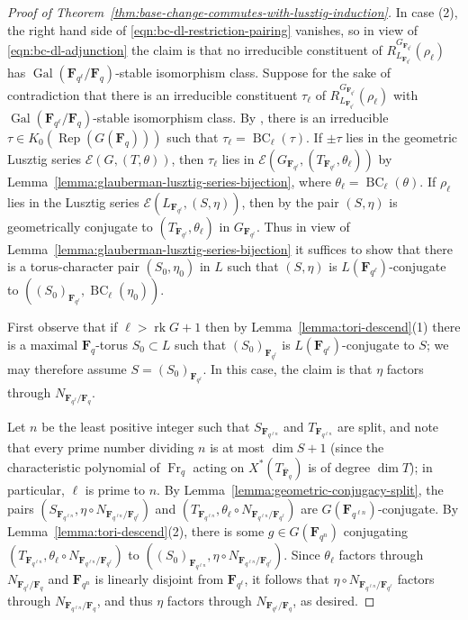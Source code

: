 \documentclass[11pt,reqno]{amsart}
\theoremstyle{definition}
\newcommand{\F}{{\mathbf F}}
\newcommand{\cE}{\mathcal{E}}
\DeclareMathOperator{\BC}{BC}
\DeclareMathOperator{\Fr}{Fr}
\DeclareMathOperator{\Gal}{Gal}
\DeclareMathOperator{\Rep}{Rep}
\DeclareMathOperator{\rk}{rk}
\newcommand{\ol}[1]{\overline{#1}}
\begin{document}
\begin{proof}[Proof of Theorem~\ref{thm:base-change-commutes-with-lusztig-induction}]
    In case (2), the right hand side of \eqref{eqn:bc-dl-restriction-pairing} vanishes, so in view of \eqref{eqn:bc-dl-adjunction} the claim is that no irreducible constituent of $R_{L_{\F_{q^\ell}}}^{G_{\F_{q^\ell}}}(\rho_\ell)$ has $\Gal(\F_{q^\ell}/\F_q)$-stable isomorphism class. Suppose for the sake of contradiction that there is an irreducible constituent $\tau_\ell$ of $R_{L_{\F_{q^\ell}}}^{G_{\F_{q^\ell}}}(\rho_\ell)$ with $\Gal(\F_{q^\ell}/\F_q)$-stable isomorphism class. By \cite[Theorem 3]{Gla68}, there is an irreducible $\tau \in K_0(\Rep(G(\F_q)))$ such that $\tau_\ell = \BC_\ell(\tau)$. If $\pm\tau$ lies in the geometric Lusztig series $\cE(G, (T, \theta))$, then $\tau_\ell$ lies in $\cE(G_{\F_{q^\ell}}, (T_{\F_{q^\ell}}, \theta_\ell))$ by Lemma~\ref{lemma:glauberman-lusztig-series-bijection}, where $\theta_\ell = \BC_\ell(\theta)$. If $\rho_\ell$ lies in the Lusztig series $\cE(L_{\F_{q^\ell}}, (S, \eta))$, then by \cite[Th\'eor\`eme 11.10]{Bon06} the pair $(S, \eta)$ is geometrically conjugate to $(T_{\F_{q^\ell}}, \theta_\ell)$ in $G_{\F_{q^\ell}}$. Thus in view of Lemma~\ref{lemma:glauberman-lusztig-series-bijection} it suffices to show that there is a torus-character pair $(S_0, \eta_0)$ in $L$ such that $(S, \eta)$ is $L(\F_{q^\ell})$-conjugate to $((S_0)_{\F_{q^\ell}}, \BC_\ell(\eta_0))$.

    First observe that if $\ell > \rk G + 1$ then by Lemma~\ref{lemma:tori-descend}(1) there is a maximal $\F_q$-torus $S_0 \subset L$ such that $(S_0)_{\F_{q^\ell}}$ is $L(\F_{q^\ell})$-conjugate to $S$; we may therefore assume $S = (S_0)_{\F_{q^\ell}}$. In this case, the claim is that $\eta$ factors through $N_{\F_{q^\ell}/\F_q}$.
    
    Let $n$ be the least positive integer such that $S_{\F_{q^{\ell n}}}$ and $T_{\F_{q^{\ell n}}}$ are split, and note that every prime number dividing $n$ is at most $\dim S + 1$ (since the characteristic polynomial of $\Fr_q$ acting on $X^*(T_{\ol\F_q})$ is of degree $\dim T$); in particular, $\ell$ is prime to $n$. By Lemma~\ref{lemma:geometric-conjugacy-split}, the pairs $(S_{\F_{q^{\ell n}}}, \eta \circ N_{\F_{q^{\ell n}}/\F_{q^\ell}})$ and $(T_{\F_{q^{\ell n}}}, \theta_\ell \circ N_{\F_{q^{\ell n}}/\F_{q^\ell}})$ are $G(\F_{q^{\ell n}})$-conjugate. By Lemma~\ref{lemma:tori-descend}(2), there is some $g \in G(\F_{q^n})$ conjugating $(T_{\F_{q^{\ell n}}}, \theta_\ell \circ N_{\F_{q^{\ell n}}/\F_{q^\ell}})$ to $((S_0)_{\F_{q^{\ell n}}}, \eta \circ N_{\F_{q^{\ell n}}/\F_{q^\ell}})$. Since $\theta_\ell$ factors through $N_{\F_{q^\ell}/\F_q}$ and $\F_{q^n}$ is linearly disjoint from $\F_{q^\ell}$, it follows that $\eta \circ N_{\F_{q^{\ell n}}/\F_{q^\ell}}$ factors through $N_{\F_{q^{\ell n}}/\F_q}$, and thus $\eta$ factors through $N_{\F_{q^\ell}/\F_q}$, as desired.
\end{proof}
\end{document}
